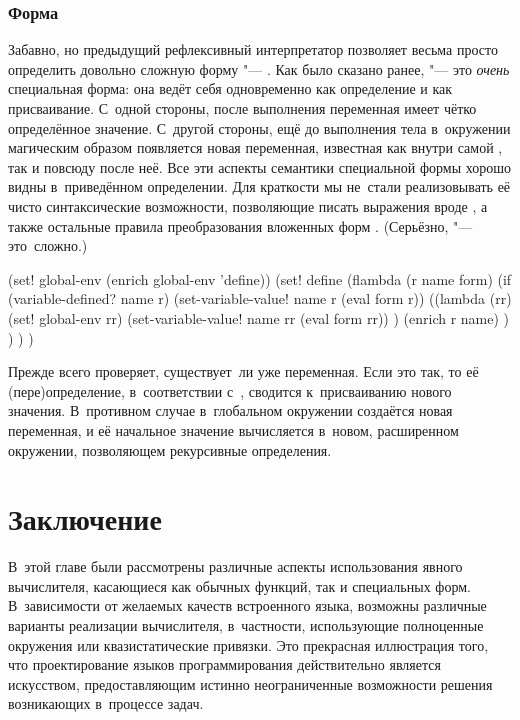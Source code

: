 \subsubsection{\texorpdfstring{Форма \protect{}}{Форма define}}%
\label{reflection/reflective-interpreter/sssect:define}

Забавно, но предыдущий рефлексивный интерпретатор позволяет весьма просто
определить довольно сложную форму "--- . Как было сказано ранее,
 "--- это \emph{очень} специальная форма: она ведёт себя одновременно
как определение и как присваивание. С~одной стороны, после выполнения
 переменная имеет чётко определённое значение. С~другой стороны, ещё
до выполнения тела  в~окружении магическим образом появляется новая
переменная, известная как внутри самой , так и повсюду после неё. Все
эти аспекты семантики специальной формы  хорошо видны в~приведённом
определении. Для краткости мы не~стали реализовывать её чисто синтаксические
возможности, позволяющие писать выражения вроде , а также остальные правила преобразования вложенных форм
. (Серьёзно,  "--- это~сложно.)

\begin{code:lisp}
(set! global-env (enrich global-env 'define))
(set! define
      (flambda (r name form)
        (if (variable-defined? name r)
            (set-variable-value! name r (eval form r))
            ((lambda (rr)
               (set! global-env rr)
               (set-variable-value! name rr (eval form rr)) )
             (enrich r name) ) ) ) )
\end{code:lisp}

Прежде всего  проверяет, существует~ли уже переменная. Если это так,
то её (пере)определение, в~соответствии с~\RnRS, сводится к~присваиванию нового
значения. В~противном случае в~глобальном окружении создаётся новая переменная,
и её начальное значение вычисляется в~новом, расширенном окружении, позволяющем
рекурсивные определения.


\section{Заключение}\label{reflection/sect:conclusions}

В~этой главе были рассмотрены различные аспекты использования явного
вычислителя, касающиеся как обычных функций, так и специальных форм.
В~зависимости от желаемых качеств встроенного языка, возможны различные варианты
реализации вычислителя, в~частности, использующие полноценные окружения или
квазистатические привязки. Это прекрасная иллюстрация того, что проектирование
языков программирования действительно является искусством, предоставляющим
истинно неограниченные возможности решения возникающих в~процессе задач.


